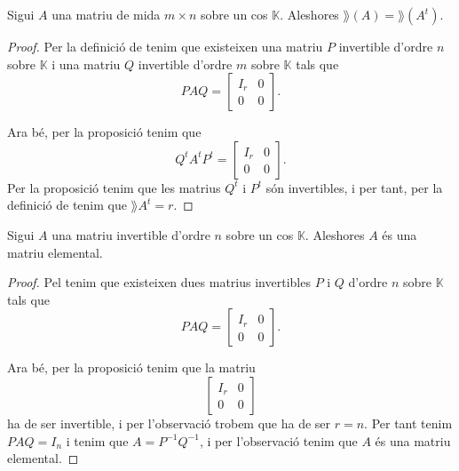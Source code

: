 \documentclass[../Apunts.tex]{subfiles}
\begin{document}
	\begin{proposition}
		\label{prop:rang de la matriu transposada és el rang de la matriu}
		Sigui \(A\) una matriu de mida \(m\times n\) sobre un cos \(\mathbb{K}\). Aleshores \(\rang(A)=\rang(A^{t})\).
		\begin{proof}
			Per la definició de  tenim que existeixen una matriu \(P\) invertible d'ordre \(n\) sobre \(\mathbb{K}\) i una matriu \(Q\) invertible d'ordre \(m\) sobre \(\mathbb{K}\) tals que
			\[PAQ=\left[\begin{array}{c|c}
			I_{r} & 0 \\\hline
			0 & 0
			\end{array}\right].\]
			
			Ara bé, per la proposició  tenim que
			\[Q^{t}A^{t}P^{t}=\left[\begin{array}{c|c}
			I_{r} & 0 \\\hline
			0 & 0
			\end{array}\right].\]
			Per la proposició  tenim que les matrius \(Q^{t}\) i \(P^{t}\) són invertibles, i per tant, per la definició de  tenim que \(\rang{A^{t}}=r\).
		\end{proof}
	\end{proposition}
	\begin{proposition}
		\label{prop:una matriu invertible és producte de matrius elementals}
		Sigui \(A\) una matriu invertible d'ordre \(n\) sobre un cos \(\mathbb{K}\). Aleshores \(A\) és una matriu elemental.
		\begin{proof}
			Pel  tenim que existeixen dues matrius invertibles \(P\) i \(Q\) d'ordre \(n\) sobre \(\mathbb{K}\) tals que
			\[PAQ=\left[\begin{array}{c|c}
			I_{r} & 0\\\hline
			0 & 0
			\end{array}\right].\]
			
			Ara bé, per la proposició  tenim que la matriu
			\[\left[\begin{array}{c|c}
			I_{r} & 0\\\hline
			0 & 0
			\end{array}\right]\]
			ha de ser invertible, i per l'observació  trobem que ha de ser \(r=n\). Per tant tenim \(PAQ=I_{n}\) i tenim que \(A=P^{-1}Q^{-1}\), i per l'observació  tenim que \(A\) és una matriu elemental.
		\end{proof}
	\end{proposition}
\end{document}
